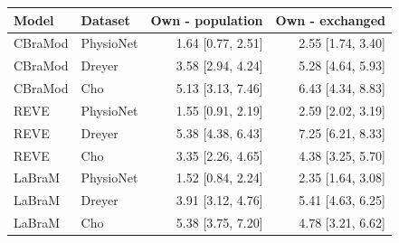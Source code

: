 \begin{tabular}{llrr}
\toprule
Model & Dataset & Own - population & Own - exchanged \\
\midrule
CBraMod & PhysioNet & 1.64 [0.77, 2.51] & 2.55 [1.74, 3.40] \\
CBraMod & Dreyer & 3.58 [2.94, 4.24] & 5.28 [4.64, 5.93] \\
CBraMod & Cho & 5.13 [3.13, 7.46] & 6.43 [4.34, 8.83] \\
REVE & PhysioNet & 1.55 [0.91, 2.19] & 2.59 [2.02, 3.19] \\
REVE & Dreyer & 5.38 [4.38, 6.43] & 7.25 [6.21, 8.33] \\
REVE & Cho & 3.35 [2.26, 4.65] & 4.38 [3.25, 5.70] \\
LaBraM & PhysioNet & 1.52 [0.84, 2.24] & 2.35 [1.64, 3.08] \\
LaBraM & Dreyer & 3.91 [3.12, 4.76] & 5.41 [4.63, 6.25] \\
LaBraM & Cho & 5.38 [3.75, 7.20] & 4.78 [3.21, 6.62] \\
\bottomrule
\end{tabular}
